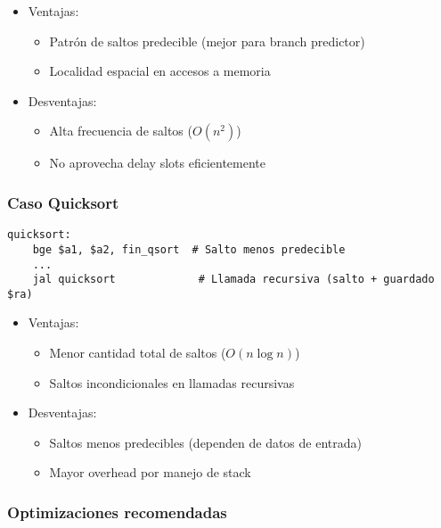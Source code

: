 \documentclass{article}
\begin{document}
\begin{itemize}
    \item Ventajas:
    \begin{itemize}
        \item Patrón de saltos predecible (mejor para branch predictor)
        \item Localidad espacial en accesos a memoria
    \end{itemize}
    
    \item Desventajas:
    \begin{itemize}
        \item Alta frecuencia de saltos ($O(n^2)$)
        \item No aprovecha delay slots eficientemente
    \end{itemize}
\end{itemize}

\subsubsection*{Caso Quicksort}

\begin{verbatim}
quicksort:
    bge $a1, $a2, fin_qsort  # Salto menos predecible
    ...
    jal quicksort             # Llamada recursiva (salto + guardado $ra)
\end{verbatim}

\begin{itemize}
    \item Ventajas:
    \begin{itemize}
        \item Menor cantidad total de saltos ($O(n \log n)$)
        \item Saltos incondicionales en llamadas recursivas
    \end{itemize}
    
    \item Desventajas:
    \begin{itemize}
        \item Saltos menos predecibles (dependen de datos de entrada)
        \item Mayor overhead por manejo de stack
    \end{itemize}
\end{itemize}

\subsubsection*{Optimizaciones recomendadas}
\end{document}
